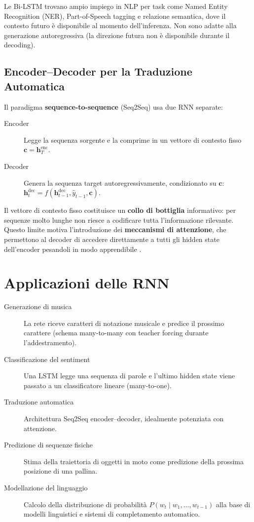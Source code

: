 Le Bi-LSTM trovano ampio impiego in NLP per task come Named Entity Recognition
(NER), Part-of-Speech tagging e relazione semantica, dove il contesto futuro è
disponibile al momento dell'inferenza. Non sono adatte alla generazione
autoregressiva (la direzione futura non è disponibile durante il decoding).

\subsection{Encoder--Decoder per la Traduzione Automatica}
\label{subsec:seq2seq}

Il paradigma \textbf{sequence-to-sequence} (Seq2Seq) usa due RNN separate:

\begin{description}
  \item[Encoder] Legge la sequenza sorgente e la comprime in un vettore di
        contesto fisso $\mathbf{c} = \mathbf{h}_T^{\text{enc}}$.
  \item[Decoder] Genera la sequenza target autoregressivamente, condizionato
        su $\mathbf{c}$:
        $\mathbf{h}_t^{\text{dec}} = f(\mathbf{h}_{t-1}^{\text{dec}},
        \hat{y}_{t-1}, \mathbf{c})$.
\end{description}

Il vettore di contesto fisso costituisce un \textbf{collo di bottiglia}
informativo: per sequenze molto lunghe non riesce a codificare tutta
l'informazione rilevante. Questo limite motiva l'introduzione dei
\textbf{meccanismi di attenzione}, che permettono al decoder di accedere
direttamente a tutti gli hidden state dell'encoder pesandoli in modo
apprendibile \citep{bahdanau2015attention}.

\section{Applicazioni delle RNN}
\label{sec:rnn-applications}

\begin{description}
  \item[Generazione di musica] La rete riceve caratteri di notazione musicale
        e predice il prossimo carattere (schema many-to-many con teacher
        forcing durante l'addestramento).
  \item[Classificazione del sentiment] Una LSTM legge una sequenza di parole
        e l'ultimo hidden state viene passato a un classificatore lineare
        (many-to-one).
  \item[Traduzione automatica] Architettura Seq2Seq encoder--decoder, idealmente
        potenziata con attenzione.
  \item[Predizione di sequenze fisiche] Stima della traiettoria di oggetti in
        moto come predizione della prossima posizione di una pallina.
  \item[Modellazione del linguaggio] Calcolo della distribuzione di probabilità
        $P(w_t \mid w_1, \ldots, w_{t-1})$ alla base di modelli linguistici e
        sistemi di completamento automatico.
\end{description}

